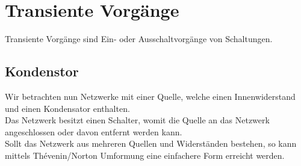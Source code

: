 %
%
%
%
%
%
%
%
%

\newpage
\section{Transiente Vorgänge}
\fix \fix
Transiente Vorgänge sind Ein- oder Ausschaltvorgänge von Schaltungen.
\fix
\subsection{Kondenstor}
\fix
Wir betrachten nun Netzwerke mit einer Quelle, welche einen Innenwiderstand und einen Kondensator enthalten. \\
Das Netzwerk besitzt einen Schalter, womit die Quelle an das Netzwerk angeschlossen oder davon entfernt werden kann. \\
Sollt das Netzwerk aus mehreren Quellen und Widerständen bestehen, so kann mittels Thévenin/Norton Umformung eine einfachere Form erreicht werden.

